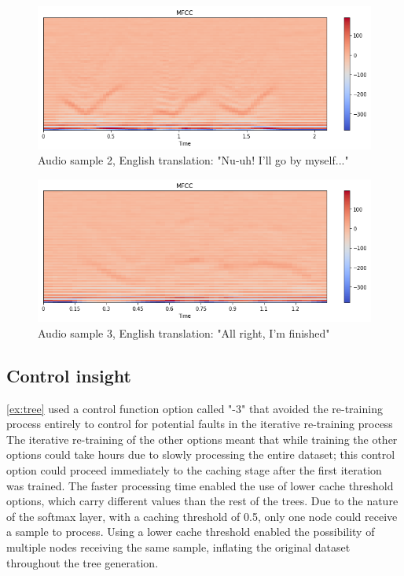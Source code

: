 \begin{figure}  %
  \centering
  \includegraphics[width=.7\textwidth]{figures/sample2.png}
  \caption{Audio sample 2, English translation: "Nu-uh! I'll go by myself..."}
  \label{fig:tree:sample2}
\end{figure}

\begin{figure}  %
  \centering
  \includegraphics[width=.7\textwidth]{figures/sample3.png}
  \caption{Audio sample 3, English translation: "All right, I'm finished"}
  \label{fig:tree:sample3}
\end{figure}

\subsection{Control insight}
\cref{ex:tree} used a control function option called "-3" that avoided the re-training process entirely to control for potential faults in the iterative re-training process
The iterative re-training of the other options meant that while training the other options could take hours due to slowly processing the entire dataset; this control option could proceed immediately to the caching stage after the first iteration was trained.
The faster processing time enabled the use of lower cache threshold options, which carry different values than the rest of the trees.
Due to the nature of the softmax layer, with a caching threshold of 0.5, only one node could receive a sample to process.
Using a lower cache threshold enabled the possibility of multiple nodes receiving the same sample, inflating the original dataset throughout the tree generation.

